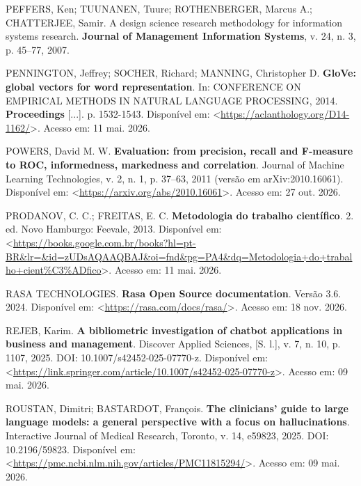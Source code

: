\documentclass[12pt,a4paper]{extarticle}
\begin{document}
\vspace{0.5cm}\noindent
PEFFERS, Ken; TUUNANEN, Tuure; ROTHENBERGER, Marcus A.; CHATTERJEE, Samir. A design science research methodology for information systems research. \textbf{Journal of Management Information Systems}, v. 24, n. 3, p. 45--77, 2007.

\vspace{0.5cm}\noindent
PENNINGTON, Jeffrey; SOCHER, Richard; MANNING, Christopher D. \textbf{GloVe: global vectors for word representation}. In: CONFERENCE ON EMPIRICAL METHODS IN NATURAL LANGUAGE PROCESSING, 2014. \textbf{Proceedings} [...]. p. 1532-1543. Disponível em: <\url{https://aclanthology.org/D14-1162/}>. Acesso em: 11 mai. 2026.

\vspace{0.5cm}\noindent
POWERS, David M. W. \textbf{Evaluation: from precision, recall and F-measure to ROC, informedness, markedness and correlation}. Journal of Machine Learning Technologies, v. 2, n. 1, p. 37--63, 2011 (versão em arXiv:2010.16061). Disponível em: <\url{https://arxiv.org/abs/2010.16061}>. Acesso em: 27 out. 2026.

\vspace{0.5cm}\noindent
PRODANOV, C. C.; FREITAS, E. C. \textbf{Metodologia do trabalho científico}. 2. ed. Novo Hamburgo: Feevale, 2013. Disponível em: <\url{https://books.google.com.br/books?hl=pt-BR&lr=&id=zUDsAQAAQBAJ&oi=fnd&pg=PA4&dq=Metodologia+do+trabalho+cient%C3%ADfico}>. Acesso em: 11 mai. 2026.

\vspace{0.5cm}\noindent
RASA TECHNOLOGIES. \textbf{Rasa Open Source documentation}. Versão 3.6. 2024. Disponível em: <\url{https://rasa.com/docs/rasa/}>. Acesso em: 18 nov. 2026.

\vspace{0.5cm}\noindent
REJEB, Karim. \textbf{A bibliometric investigation of chatbot applications in business and management}. Discover Applied Sciences, [S. l.], v. 7, n. 10, p. 1107, 2025. DOI: 10.1007/s42452-025-07770-z. Disponível em: <\url{https://link.springer.com/article/10.1007/s42452-025-07770-z}>. Acesso em: 09 mai. 2026.

\vspace{0.5cm}\noindent
ROUSTAN, Dimitri; BASTARDOT, François. \textbf{The clinicians' guide to large language models: a general perspective with a focus on hallucinations}. Interactive Journal of Medical Research, Toronto, v. 14, e59823, 2025. DOI: 10.2196/59823. Disponível em: <\url{https://pmc.ncbi.nlm.nih.gov/articles/PMC11815294/}>. Acesso em: 09 mai. 2026.
\end{document}
